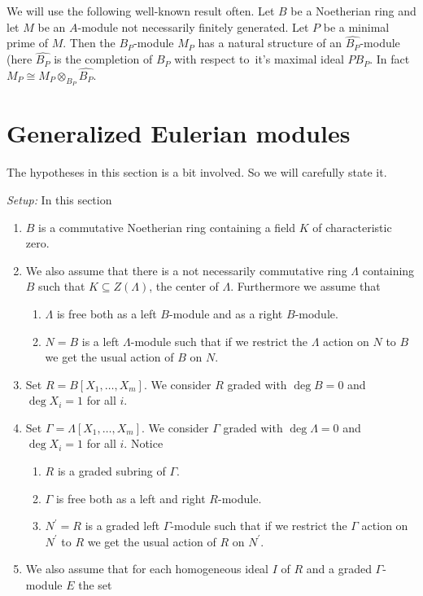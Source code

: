\documentclass{amsart}
\newcommand{\wrt}{with respect to}
\theoremstyle{plain}
\theoremstyle{definition}
\theoremstyle{remark}
\begin{document}
\s \label{min-loc} We will use the following well-known result often. Let $B$ be a Noetherian ring and let $M$ be an 
$A$-module not necessarily finitely generated. Let $P$ be a minimal prime of $M$. Then the $B_P$-module $M_P$ has a natural structure
of an $\widehat{B_P}$-module (here $\widehat{B_P}$ is the completion of $B_P$ \wrt \ it's maximal ideal $PB_P$. In fact
$M_P \cong  M_P\otimes_{B_P}\widehat{B_P}$.

\section{Generalized Eulerian modules}
The hypotheses in this section is a bit involved. So we will carefully state it.

\s \label{setup-gen-eul} \emph{Setup:}  In this section 
\begin{enumerate}
 \item $B$ is a commutative Noetherian ring containing a field $K$ of characteristic zero.
 \item
 We also assume that there  is a not necessarily commutative ring $\Lambda$ containing $B$ such
that $K \subseteq Z(\Lambda)$, the center of $\Lambda$. Furthermore we assume that
\begin{enumerate}
 \item $\Lambda$ is free both as a left $B$-module and as a right $B$-module.
 \item $N = B$ is a left $\Lambda$-module such that if we restrict the $\Lambda$ action on $N$ to $B$ we get the usual
 action of $B$ on $N$.
\end{enumerate}
\item
Set $R = B[X_1,\ldots, X_m]$. We consider $R$ graded with $\deg B = 0$ and $\deg X_i = 1$ for all $i$.
\item
Set $\Gamma = \Lambda[X_1,\ldots, X_m]$. We consider $\Gamma$ graded with $\deg \Lambda = 0$ and $\deg X_i = 1$ for
all $i$. Notice
\begin{enumerate}
 \item $R$ is a graded subring of $\Gamma$.
 \item $\Gamma$ is free both as a left and right $R$-module.
 \item $N^\prime  = R$ is a graded left $\Gamma$-module such that if we restrict the $\Gamma$ action on $N^\prime$ to $R$ we get the usual
 action of $R$ on $N^\prime$.
\end{enumerate}
\item
We also assume that for each homogeneous ideal $I$ of $R$ and a graded $\Gamma$-module $E$ the set

\end{enumerate}
\end{document}
